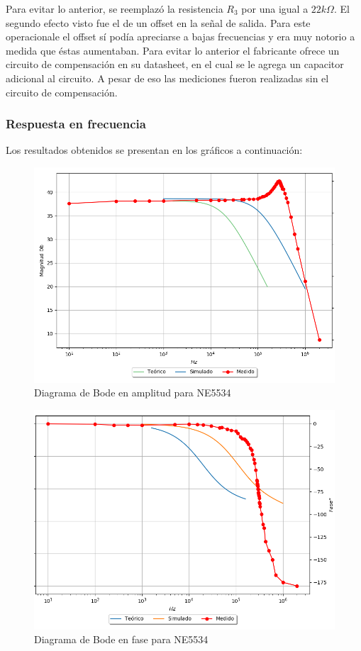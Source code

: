 Para evitar lo anterior, se reemplazó la resistencia $R_3$ por una igual a $22k\Omega$. El segundo efecto visto fue el de un offset en la señal de salida. Para este operacionale el offset sí podía apreciarse a bajas frecuencias y era muy notorio a medida que éstas aumentaban. Para evitar lo anterior el fabricante ofrece un circuito de compensación en su datasheet, en el cual se le agrega un capacitor adicional al circuito. A pesar de eso las mediciones fueron realizadas sin el circuito de compensación.

\subsubsection{Respuesta en frecuencia}
Los resultados obtenidos se presentan en los gráficos a continuación:

\begin{figure}[H]	
	\centering
	\includegraphics[width=\textwidth]{Ejercicio2/Imagenes/Bode_Amp_NE5534.png}
	\caption{Diagrama de Bode en amplitud para NE5534}
	\label{fig:bode_amp_NE5534}
\end{figure}

\begin{figure}[H]	
	\centering
	\includegraphics[width=\textwidth]{Ejercicio2/Imagenes/Bode_Fase_NE5534.png}
	\caption{Diagrama de Bode en fase para NE5534}
	\label{fig:bode_amp_NE5534}
\end{figure}

